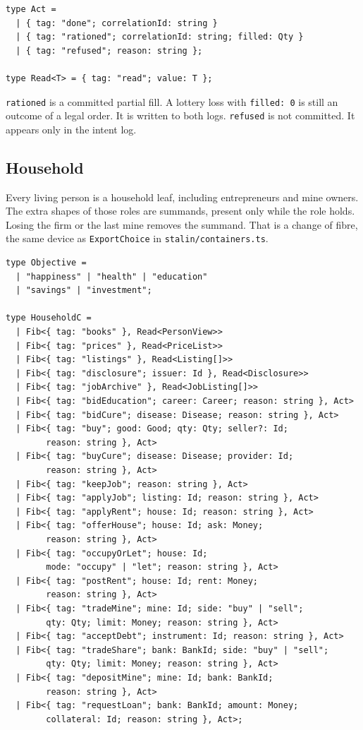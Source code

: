 \documentclass[11pt]{article}
\newenvironment{keep}{\noindent\begin{minipage}{\linewidth}}{\end{minipage}}
\begin{document}
\begin{keep}
\begin{lstlisting}
type Act =
  | { tag: "done"; correlationId: string }
  | { tag: "rationed"; correlationId: string; filled: Qty }
  | { tag: "refused"; reason: string };

type Read<T> = { tag: "read"; value: T };
\end{lstlisting}
\end{keep}

\texttt{rationed} is a committed partial fill. A lottery loss with
\texttt{filled: 0} is still an outcome of a legal order. It is written to
both logs. \texttt{refused} is not committed. It appears only in the intent
log.

\subsection{Household}

Every living person is a household leaf, including entrepreneurs and mine
owners. The extra shapes of those roles are summands, present only while the
role holds. Losing the firm or the last mine removes the summand. That is a
change of fibre, the same device as \texttt{ExportChoice} in
\texttt{stalin/containers.ts}.

\begin{keep}
\begin{lstlisting}
type Objective =
  | "happiness" | "health" | "education"
  | "savings" | "investment";

type HouseholdC =
  | Fib<{ tag: "books" }, Read<PersonView>>
  | Fib<{ tag: "prices" }, Read<PriceList>>
  | Fib<{ tag: "listings" }, Read<Listing[]>>
  | Fib<{ tag: "disclosure"; issuer: Id }, Read<Disclosure>>
  | Fib<{ tag: "jobArchive" }, Read<JobListing[]>>
  | Fib<{ tag: "bidEducation"; career: Career; reason: string }, Act>
  | Fib<{ tag: "bidCure"; disease: Disease; reason: string }, Act>
  | Fib<{ tag: "buy"; good: Good; qty: Qty; seller?: Id;
        reason: string }, Act>
  | Fib<{ tag: "buyCure"; disease: Disease; provider: Id;
        reason: string }, Act>
  | Fib<{ tag: "keepJob"; reason: string }, Act>
  | Fib<{ tag: "applyJob"; listing: Id; reason: string }, Act>
  | Fib<{ tag: "applyRent"; house: Id; reason: string }, Act>
  | Fib<{ tag: "offerHouse"; house: Id; ask: Money;
        reason: string }, Act>
  | Fib<{ tag: "occupyOrLet"; house: Id;
        mode: "occupy" | "let"; reason: string }, Act>
  | Fib<{ tag: "postRent"; house: Id; rent: Money;
        reason: string }, Act>
  | Fib<{ tag: "tradeMine"; mine: Id; side: "buy" | "sell";
        qty: Qty; limit: Money; reason: string }, Act>
  | Fib<{ tag: "acceptDebt"; instrument: Id; reason: string }, Act>
  | Fib<{ tag: "tradeShare"; bank: BankId; side: "buy" | "sell";
        qty: Qty; limit: Money; reason: string }, Act>
  | Fib<{ tag: "depositMine"; mine: Id; bank: BankId;
        reason: string }, Act>
  | Fib<{ tag: "requestLoan"; bank: BankId; amount: Money;
        collateral: Id; reason: string }, Act>;
\end{lstlisting}
\end{keep}
\end{document}
